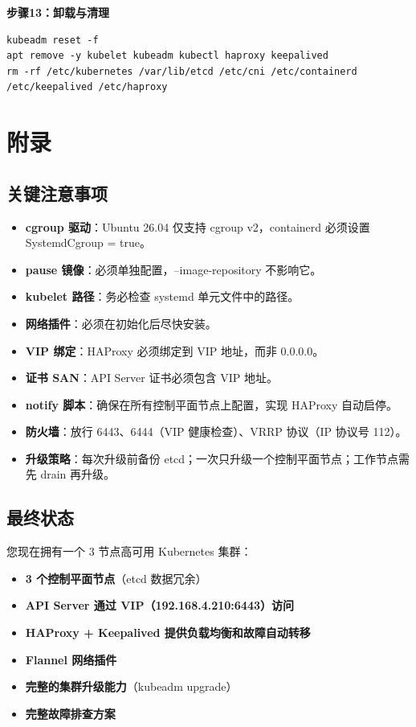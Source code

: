 \documentclass[12pt,UTF8]{ctexbook}
\begin{document}
\textbf{步骤13：卸载与清理}

\begin{lstlisting}
kubeadm reset -f
apt remove -y kubelet kubeadm kubectl haproxy keepalived
rm -rf /etc/kubernetes /var/lib/etcd /etc/cni /etc/containerd /etc/keepalived /etc/haproxy
\end{lstlisting}

\part{附录}

\chapter{关键注意事项}

\begin{itemize}
    \item \textbf{cgroup 驱动}：Ubuntu 26.04 仅支持 cgroup v2，containerd 必须设置 SystemdCgroup = true。
    \item \textbf{pause 镜像}：必须单独配置，--image-repository 不影响它。
    \item \textbf{kubelet 路径}：务必检查 systemd 单元文件中的路径。
    \item \textbf{网络插件}：必须在初始化后尽快安装。
    \item \textbf{VIP 绑定}：HAProxy 必须绑定到 VIP 地址，而非 0.0.0.0。
    \item \textbf{证书 SAN}：API Server 证书必须包含 VIP 地址。
    \item \textbf{notify 脚本}：确保在所有控制平面节点上配置，实现 HAProxy 自动启停。
    \item \textbf{防火墙}：放行 6443、6444（VIP 健康检查）、VRRP 协议（IP 协议号 112）。
    \item \textbf{升级策略}：每次升级前备份 etcd；一次只升级一个控制平面节点；工作节点需先 drain 再升级。
\end{itemize}

\chapter{最终状态}

您现在拥有一个 3 节点高可用 Kubernetes 集群：

\begin{itemize}
    \item \textbf{3 个控制平面节点}（etcd 数据冗余）
    \item \textbf{API Server 通过 VIP（192.168.4.210:6443）访问}
    \item \textbf{HAProxy + Keepalived 提供负载均衡和故障自动转移}
    \item \textbf{Flannel 网络插件}
    \item \textbf{完整的集群升级能力}（kubeadm upgrade）
    \item \textbf{完整故障排查方案}
\end{itemize}
\end{document}

